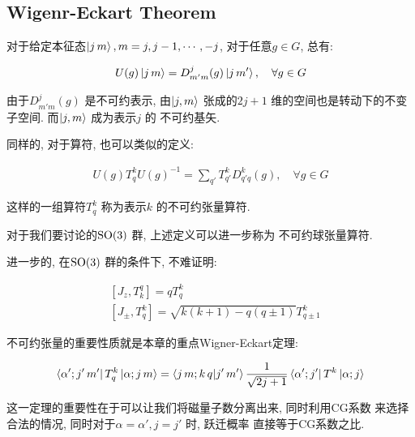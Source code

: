 \subsection{Wigenr-Eckart Theorem}

对于给定本征态$\ket{j\,m},m=j,j-1,\cdots,-j$, 对于任意$g\in G$,
总有:

\begin{equation}
  \begin{aligned}
    U(g)\ket{j\,m} = D^{j}_{m'm}(g) \ket{j\,m'}, \quad \forall g\in G
  \end{aligned}
\end{equation}

由于$D^{j}_{m'm}(g)$ 是不可约表示, 由$\ket{j,m}$ 张成的$2j+1$ 
维的空间也是转动下的不变子空间. 而$\ket{j,m}$ 成为表示$j$ 的
不可约基矢.

同样的, 对于算符, 也可以类似的定义:

\begin{equation}
  \begin{aligned}
    U(g)T^{k}_{q}U(g)^{-1} = \sum_{q'}T^{k}_{q'}D^{k}_{q'q}(g), \quad \forall g\in G
  \end{aligned}
\end{equation}

这样的一组算符$T^{k}_{q}$ 称为表示$k$ 的不可约张量算符.

\begin{remark}
  对于我们要讨论的${\rm SO}(3)$ 群, 上述定义可以进一步称为
  不可约球张量算符.
\end{remark}

进一步的, 在${\rm SO}(3)$ 群的条件下, 不难证明:

\begin{equation}
  \begin{aligned}
    &[J_{z}, T^{q}_{k}] = q T^{k}_{q}\\
    &[J_{\pm}, T^{k}_{q}] = \sqrt{k(k+1) - q(q\pm 1)} T^{k}_{q\pm 1}
  \end{aligned}
\end{equation}

不可约张量的重要性质就是本章的重点Wigner-Eckart定理:

\begin{theorem}
  \begin{equation}
    \begin{aligned}
      \bra{\alpha';j'\,m'}T^{k}_{q}\ket{\alpha;j\,m} = \bra{j\,m;k\,q}\ket{j'\,m'}\frac{1}{\sqrt{2j+1}}\bra{\alpha';j'}T^{k}\ket{\alpha;j}
    \end{aligned}
  \end{equation}
\end{theorem}

这一定理的重要性在于可以让我们将磁量子数分离出来, 同时利用CG系数
来选择合法的情况, 同时对于$\alpha=\alpha', j=j'$ 时, 跃迁概率
直接等于CG系数之比.
